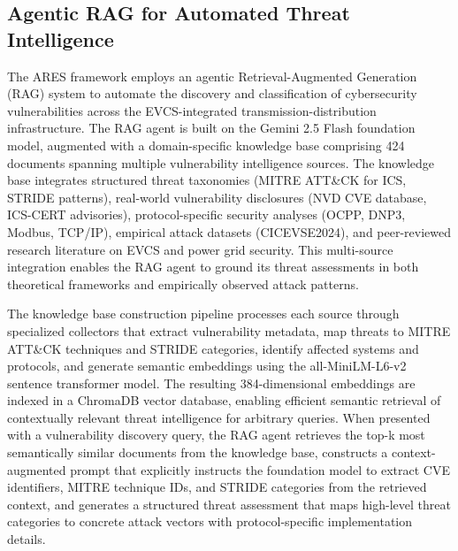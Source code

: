 
\subsection{Agentic RAG for Automated Threat Intelligence}

The ARES framework employs an agentic Retrieval-Augmented Generation (RAG) system to automate the discovery and classification of cybersecurity vulnerabilities across the EVCS-integrated transmission-distribution infrastructure. The RAG agent is built on the Gemini 2.5 Flash foundation model, augmented with a domain-specific knowledge base comprising 424 documents spanning multiple vulnerability intelligence sources. The knowledge base integrates structured threat taxonomies (MITRE ATT\&CK for ICS, STRIDE patterns), real-world vulnerability disclosures (NVD CVE database, ICS-CERT advisories), protocol-specific security analyses (OCPP, DNP3, Modbus, TCP/IP), empirical attack datasets (CICEVSE2024), and peer-reviewed research literature on EVCS and power grid security. This multi-source integration enables the RAG agent to ground its threat assessments in both theoretical frameworks and empirically observed attack patterns.

The knowledge base construction pipeline processes each source through specialized collectors that extract vulnerability metadata, map threats to MITRE ATT\&CK techniques and STRIDE categories, identify affected systems and protocols, and generate semantic embeddings using the all-MiniLM-L6-v2 sentence transformer model. The resulting 384-dimensional embeddings are indexed in a ChromaDB vector database, enabling efficient semantic retrieval of contextually relevant threat intelligence for arbitrary queries. When presented with a vulnerability discovery query, the RAG agent retrieves the top-k most semantically similar documents from the knowledge base, constructs a context-augmented prompt that explicitly instructs the foundation model to extract CVE identifiers, MITRE technique IDs, and STRIDE categories from the retrieved context, and generates a structured threat assessment that maps high-level threat categories to concrete attack vectors with protocol-specific implementation details.

